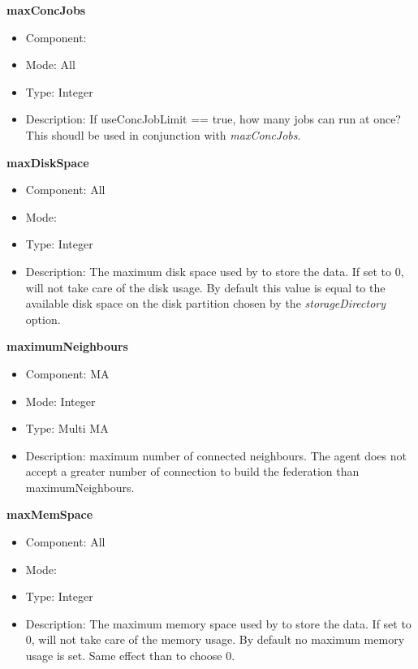 \begin{description}
\item{\bf{maxConcJobs}}
  \begin{itemize}
  \item Component: \sed
  \item Mode: All
  \item Type: Integer
  \item Description: If useConcJobLimit == true, how many jobs can run at once?
  This shoudl be used in conjunction with \emph{maxConcJobs}.
  
  \end{itemize}

\item{\bf{maxDiskSpace}}
  \begin{itemize}
  \item Component: All
  \item Mode: \dagda
  \item Type: Integer
  \item Description: The maximum disk space used by \dagda to store the data. If set
to 0, \dagda will not take care of the disk usage. By default this value is
equal to the available disk space on the disk partition chosen by the
  \textit{storageDirectory} option. 
  \end{itemize}

\item{\bf{maximumNeighbours}}
  \begin{itemize}
  \item Component: MA
  \item Mode: Integer 
  \item Type: Multi MA
  \item Description: maximum number of connected neighbours. The agent
    does not accept a greater number of connection to build the federation
    than maximumNeighbours.
  \end{itemize}

\item{\bf{maxMemSpace}}
  \begin{itemize}
  \item Component: All
  \item Mode: \dagda
  \item Type: Integer
  \item Description: The maximum memory space used by \dagda to store the data. If set
to 0, \dagda will not take care of the memory usage. By default no maximum
memory usage is set. Same effect than to choose 0.
  \end{itemize}


\end{description}
